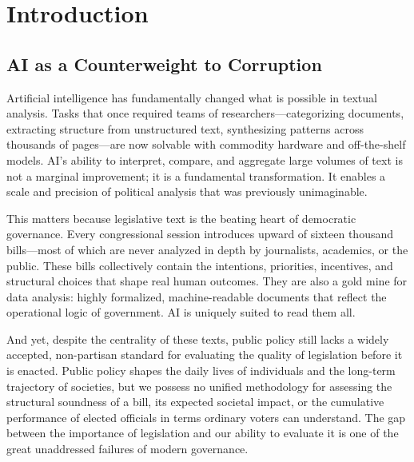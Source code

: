 \documentclass[12pt]{article}
\begin{document}
\newpage
\tableofcontents
\newpage


\section{Introduction}
\label{sec:intro}

\subsection{AI as a Counterweight to Corruption}

Artificial intelligence has fundamentally changed what is possible in textual analysis.
Tasks that once required teams of researchers—categorizing documents, extracting structure from unstructured text, synthesizing patterns across thousands of pages—are now solvable with commodity hardware and off-the-shelf models. AI’s ability to interpret, compare, and aggregate large volumes of text is not a marginal improvement; it is a fundamental transformation. It enables a scale and precision of political analysis that was previously unimaginable.

This matters because legislative text is the beating heart of democratic governance.
Every congressional session introduces upward of sixteen thousand bills—most of which are never analyzed in depth by journalists, academics, or the public. These bills collectively contain the intentions, priorities, incentives, and structural choices that shape real human outcomes. They are also a gold mine for data analysis: highly formalized, machine-readable documents that reflect the operational logic of government. AI is uniquely suited to read them all.

And yet, despite the centrality of these texts, public policy still lacks a widely accepted, non-partisan standard for evaluating the quality of legislation before it is enacted.
Public policy shapes the daily lives of individuals and the long-term trajectory of societies, but we possess no unified methodology for assessing the structural soundness of a bill, its expected societal impact, or the cumulative performance of elected officials in terms ordinary voters can understand. The gap between the importance of legislation and our ability to evaluate it is one of the great unaddressed failures of modern governance.
\end{document}
